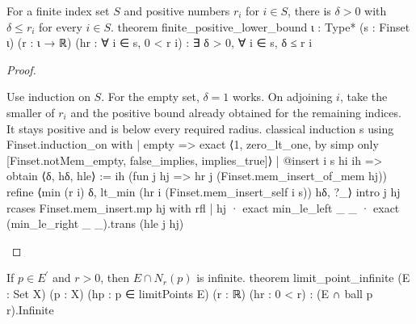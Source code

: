 \begin{lemma} \label{an1:lem:finite-positive-lower-bound}
  \begin{lean}{For a finite index set $S$ and positive numbers $r_i$ for $i\in S$, there is $\delta>0$ with $\delta\leq r_i$ for every $i\in S$.}
    theorem finite_positive_lower_bound {ι : Type*} (s : Finset ι)
        (r : ι → ℝ) (hr : ∀ i ∈ s, 0 < r i) :
        ∃ δ > 0, ∀ i ∈ s, δ ≤ r i
  \end{lean}
\end{lemma}

\begin{proof}
  \begin{lean}{Use induction on $S$. For the empty set, $\delta=1$ works. On adjoining $i$, take the smaller of $r_i$ and the positive bound already obtained for the remaining indices. It stays positive and is below every required radius.}
    classical
    induction s using Finset.induction_on with
    | empty => exact ⟨1, zero_lt_one, by simp only [Finset.notMem_empty, false_implies, implies_true]⟩
    | @insert i s hi ih =>
      obtain ⟨δ, hδ, hle⟩ := ih (fun j hj => hr j (Finset.mem_insert_of_mem hj))
      refine ⟨min (r i) δ, lt_min (hr i (Finset.mem_insert_self i s)) hδ, ?_⟩
      intro j hj
      rcases Finset.mem_insert.mp hj with rfl | hj
      · exact min_le_left _ _
      · exact (min_le_right _ _).trans (hle j hj)
  \end{lean}

\end{proof}

\begin{proposition} \label{an1:thm:limit-point-neighborhood-contains-infinite-elements}
  \begin{lean}{If $p\in E^{\prime}$ and $r>0$, then $E\cap N_r(p)$ is infinite.}
    theorem limit_point_infinite (E : Set X) (p : X)
        (hp : p ∈ limitPoints E) (r : ℝ) (hr : 0 < r) :
        (E ∩ ball p r).Infinite
  \end{lean}
\end{proposition}

